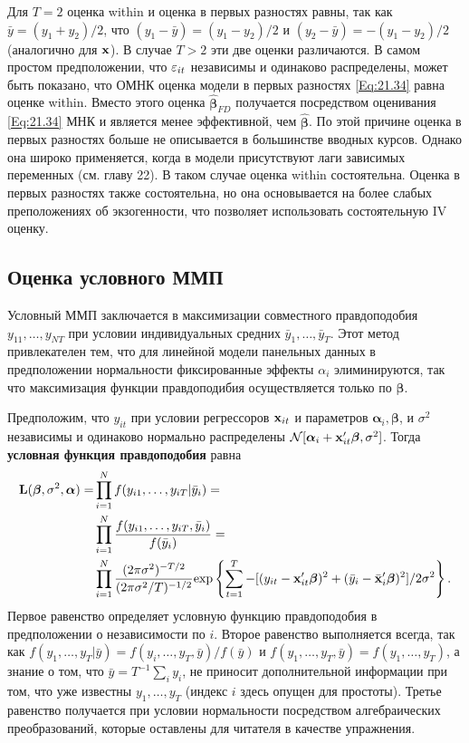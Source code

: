 Для $T=2$ оценка within и оценка в первых разностях равны, так как $\bar{y}=(y_1+y_2)/2$, что $(y_1-\bar{y})=(y_1-y_2)/2$ и $(y_2-\bar{y})=-(y_1-y_2)/2$ (аналогично для $\mathbf{x}$). В случае $T>2$ эти две оценки различаются. В самом простом предположении, что $\varepsilon_{it}$ независимы и одинаково распределены, может быть показано, что ОМНК оценка модели в первых разностях \ref{Eq:21.34} равна оценке within. Вместо этого оценка $\hat{\bm\beta}_{FD}$ получается посредством оценивания  \ref{Eq:21.34} МНК  и является менее эффективной, чем $\hat{\bm\beta}$. По этой причине оценка в первых разностях больше не описывается в большинстве вводных курсов. Однако она широко применяется, когда в модели присутствуют лаги зависимых переменных (см. главу 22). В таком случае оценка within состоятельна. Оценка в первых разностях также состоятельна, но она основывается на более слабых преположениях об экзогенности, что позволяет использовать состоятельную IV оценку.

\subsection{Оценка условного ММП}

Условный ММП заключается в максимизации совместного правдоподобия $y_{11}, \dots, y_{NT}$ при условии индивидуальных средних $\bar{y}_1, \dots, \bar{y}_T$. Этот метод привлекателен тем, что для линейной модели панельных данных в предположении нормальности фиксированные эффекты $\alpha_i$ элиминируются, так что максимизация функции правдоподибия осуществляется только по $\bm\beta$.

Предположим, что $y_{it}$ при условии регрессоров $\mathbf{x}_{it}$ и параметров $\bm\alpha_i, \bm\beta$, и  $\sigma^2$ независимы и одинаково нормально распределены $\mathcal N [\bm\alpha_i+\mathbf{x}'_{it}\bm\beta, \sigma^2]$. Тогда \textbf{условная функция правдоподобия} равна
\begin{align}
\mathbf L(\bm\beta, \sigma^2, \bm\alpha)=
& \prod^N_{i=1} f(y_{i1}, \dots, y_{iT}|\bar{y}_i) =  \label{Eq:21.38} \\
& \prod^N_{i=1} \frac{f(y_{i1}, \dots, y_{iT}, \bar{y}_i)} {f(\bar{y}_i)} = \nonumber \\
& \prod^N_{i=1} \frac{(2\pi\sigma^2)^{-T/2}}{(2\pi\sigma^2/T)^{-1/2}}\mathrm{exp}
\left\{ \sum^{T}_{t=1} -[(y_{it}-\mathbf{x}'_{it}\bm\beta)^2+(\bar{y}_i-\bar{\mathbf{x}}'_i\bm\beta)^2]/2\sigma^2 \right\}. \nonumber
\end{align}
Первое равенство определяет условную функцию правдоподобия в предположении о независимости по $i$. Второе равенство выполняется всегда, так как $f(y_1, \dots, y_T|\bar{y})=f(y_i, \dots, y_T, \bar{y})/f(\bar{y})$ и $f(y_1, \dots, y_T, \bar{y})=f(y_1, \dots, y_T)$, а знание о том, что $\bar{y}=T^{-1}\sum_i y_i$, не приносит дополнительной информации при том, что уже известны $y_1, \dots, y_T$ (индекс $i$ здесь опущен для простоты). Третье равенство получается при условии нормальности посредством алгебраических преобразований, которые оставлены для читателя в качестве упражнения.

